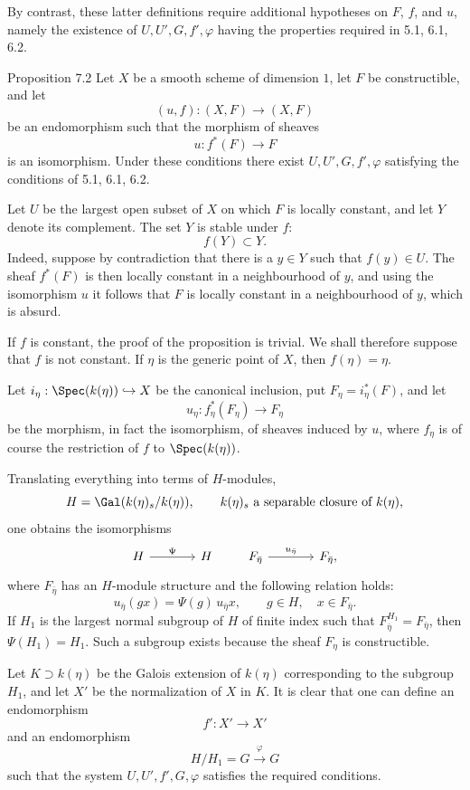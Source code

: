 By contrast, these latter definitions require additional hypotheses on $F$, $f$, and $u$, namely the existence of $U,U',G,f',\varphi$ having the properties required in 5.1, 6.1, 6.2.

\begin{statement}{Proposition 7.2}
Let $X$ be a smooth scheme of dimension $1$, let $F$ be constructible, and let
\[
(u,f):(X,F)\longrightarrow (X,F)
\]
be an endomorphism such that the morphism of sheaves
\[
u:f^*(F)\longrightarrow F
\]
is an isomorphism. Under these conditions there exist $U,U',G,f',\varphi$ satisfying the conditions of 5.1, 6.1, 6.2.
\end{statement}

\begin{prooftext}[Proof]
Let $U$ be the largest open subset of $X$ on which $F$ is locally constant, and let $Y$ denote its complement. The set $Y$ is stable under $f$:
\[
f(Y)\subset Y.
\]
Indeed, suppose by contradiction that there is a $y\in Y$ such that $f(y)\in U$. The sheaf $f^*(F)$ is then locally constant in a neighbourhood of $y$, and using the isomorphism $u$ it follows that $F$ is locally constant in a neighbourhood of $y$, which is absurd.

If $f$ is constant, the proof of the proposition is trivial. We shall therefore suppose that $f$ is not constant. If $\eta$ is the generic point of $X$, then $f(\eta)=\eta$.

Let $i_\eta:\Spec(k(\eta))\hookrightarrow X$ be the canonical inclusion, put $F_\eta=i_\eta^*(F)$, and let
\[
u_\eta:f_\eta^*(F_\eta)\longrightarrow F_\eta
\]
be the morphism, in fact the isomorphism, of sheaves induced by $u$, where $f_\eta$ is of course the restriction of $f$ to $\Spec(k(\eta))$.

Translating everything into terms of $H$-modules,
\[
H=\Gal(k(\eta)_s/k(\eta)),\qquad k(\eta)_s\text{ a separable closure of }k(\eta),
\]
one obtains the isomorphisms
\[
\begin{tikzcd}[column sep=large]
H \arrow[r,"\Psi"] & H
\end{tikzcd}
\qquad
\begin{tikzcd}[column sep=large]
F_{\bar\eta} \arrow[r,"u_{\bar\eta}"] & F_{\bar\eta},
\end{tikzcd}
\]
where $F_{\bar\eta}$ has an $H$-module structure and the following relation holds:
\[
u_{\bar\eta}(gx)=\Psi(g)\,u_{\bar\eta}x,
\qquad g\in H,
\quad x\in F_{\bar\eta}.
\]
If $H_1$ is the largest normal subgroup of $H$ of finite index such that $F_{\bar\eta}^{H_1}=F_{\bar\eta}$, then $\Psi(H_1)=H_1$. Such a subgroup exists because the sheaf $F_\eta$ is constructible.

Let $K\supset k(\eta)$ be the Galois extension of $k(\eta)$ corresponding to the subgroup $H_1$, and let $X'$ be the normalization of $X$ in $K$. It is clear that one can define an endomorphism
\[
f':X'\longrightarrow X'
\]
and an endomorphism
\[
H/H_1=G\xrightarrow{\varphi}G
\]
such that the system $U,U',f',G,\varphi$ satisfies the required conditions.
\end{prooftext}


